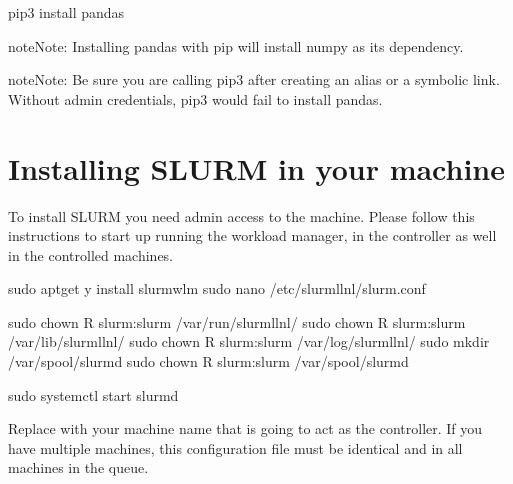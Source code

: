 \documentclass[letterpaper,10pt,english]{sphinxmanual}
\begin{document}
%
\begin{sphinxVerbatim}[commandchars=\\\{\}]
pip3 install pandas
\end{sphinxVerbatim}

\begin{sphinxadmonition}{note}{Note:}
Installing pandas with pip will install numpy as its dependency.
\end{sphinxadmonition}

\begin{sphinxadmonition}{note}{Note:}
Be sure you are calling pip3 after creating an alias or a symbolic link.
Without admin credentials, pip3 would fail to install pandas.
\end{sphinxadmonition}


\chapter{Installing SLURM in your machine}
\label{\detokenize{SLURM:installing-slurm-in-your-machine}}\label{\detokenize{SLURM:slurm-instructions}}\label{\detokenize{SLURM::doc}}
To install SLURM you need admin access to the machine. Please follow this
instructions to start up running the workload manager, in the controller as well
in the controlled machines.

%
\begin{sphinxVerbatim}[commandchars=\\\{\}]
sudo apt\PYGZhy{}get \PYGZhy{}y install slurm\PYGZhy{}wlm
sudo nano /etc/slurm\PYGZhy{}llnl/slurm.conf

sudo chown \PYGZhy{}R slurm:slurm /var/run/slurm\PYGZhy{}llnl/
sudo chown \PYGZhy{}R slurm:slurm /var/lib/slurm\PYGZhy{}llnl/
sudo chown \PYGZhy{}R slurm:slurm /var/log/slurm\PYGZhy{}llnl/
sudo mkdir /var/spool/slurmd
sudo chown \PYGZhy{}R slurm:slurm /var/spool/slurmd

sudo systemctl start slurmd
\end{sphinxVerbatim}

Replace  with your machine name that is going to act as the
controller. If you have multiple machines, this configuration file must be
identical and in all machines in the queue.
\end{document}
